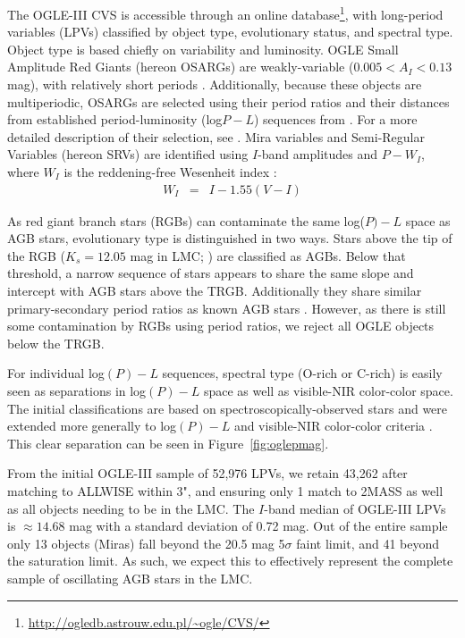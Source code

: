 The OGLE-III CVS is accessible through an online database\footnote{\url{http://ogledb.astrouw.edu.pl/~ogle/CVS/}}, with long-period variables (LPVs) classified by object type, evolutionary status, and spectral type. Object type is based chiefly on variability and luminosity. OGLE Small Amplitude Red Giants (hereon OSARGs) are weakly-variable ($0.005 < A_I < 0.13$ mag), with relatively short periods \citep[$10 < P < 100$ days;][]{2004AcA....54..129S}. Additionally, because these objects are multiperiodic, OSARGs are selected using their period ratios and their distances from established period-luminosity (log$P-L$) sequences from \cite{1999IAUS..191..151W}. For a more detailed description of their selection, see \cite{2007AcA....57..201S}. Mira variables and Semi-Regular Variables (hereon SRVs) are identified using $I$-band amplitudes and $P-W_I$, where $W_I$ is the reddening-free Wesenheit index \citep{2005AcA....55..331S}:
\begin{eqnarray}
W_I &=& I - 1.55(V-I)
\end{eqnarray}

As red giant branch stars (RGBs) can contaminate the same log($P)-L$ space as AGB stars, evolutionary type is distinguished in two ways. Stars above the tip of the RGB ($K_s = 12.05$ mag in LMC; \citealt{2004AcA....54..129S, 2007AcA....57..201S}) are classified as AGBs. Below that threshold, a narrow sequence of stars appears to share the same slope and intercept with AGB stars above the TRGB. Additionally they share similar primary-secondary period ratios as known AGB stars \citep{2005AcA....55..331S}. However, as there is still some contamination by RGBs using period ratios, we reject all OGLE objects below the TRGB.

For individual log$(P)-L$ sequences, spectral type (O-rich or C-rich) is easily seen as separations in log$(P)-L$ space as well as visible-NIR color-color space. The initial classifications are based on spectroscopically-observed stars and were extended more generally to log$(P)-L$ and visible-NIR color-color criteria \citep{2005AcA....55..331S, 2007AcA....57..201S}. This clear separation can be seen in Figure~\ref{fig:oglepmag}.

From the initial OGLE-III sample of 52,976 LPVs, we retain 43,262 after matching to ALLWISE within 3", and ensuring only 1 match to 2MASS as well as all objects needing to be in the LMC. The $I$-band median of OGLE-III LPVs is $\approx14.68$ mag with a standard deviation of 0.72 mag. Out of the entire sample only 13 objects (Miras) fall beyond the 20.5 mag 5$\sigma$ faint limit, and 41 beyond the saturation limit. As such, we expect this to effectively represent the complete sample of oscillating AGB stars in the LMC.

